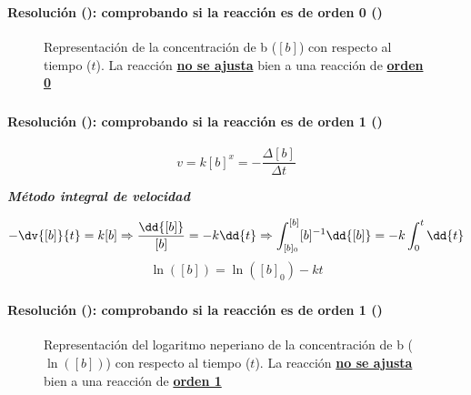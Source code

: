 \begin{frame}
    \frametitle{\ejerciciocmd}
    \framesubtitle{Resolución (): comprobando si la reacción es de orden 0 ()}
    \begin{center}
        \begin{figure}
            \caption{Representación de la concentración de b ($[b]$) con respecto al tiempo ($t$). La reacción \textbf{\underline{no se ajusta}} bien a una reacción de \textbf{\underline{orden 0}}}
            
        \end{figure}
    \end{center}
\end{frame}

\begin{frame}
    \frametitle{\ejerciciocmd}
    \framesubtitle{Resolución (): comprobando si la reacción es de orden 1 ()}
     
    $$
        v = k[b]^x = -\frac{\Delta[b]}{\Delta t}
    $$
    \begin{center}
        {\Large \textbf{\textit{Método integral de velocidad}}}
    \end{center}
    \begin{overprint}
            $$
                -\dv{[b]}{t} = k[b]\Rightarrow\frac{\dd{[b]}}{[b]} = -k\dd{t}\Rightarrow\int_{[b]_0}^{[b]}[b]^{-1}\dd{[b]} = -k\int_{0}^{t}\dd{t}
            $$
        $$
            \ln([b]) = \ln([b]_0) - kt
        $$
    \end{overprint}
\end{frame}

\begin{frame}
    \frametitle{\ejerciciocmd}
    \framesubtitle{Resolución (): comprobando si la reacción es de orden 1 ()}
    \begin{center}
        \begin{figure}
            \caption{Representación del logaritmo neperiano de la concentración de b ($\ln([b])$) con respecto al tiempo ($t$). La reacción \textbf{\underline{no se ajusta}} bien a una reacción de \textbf{\underline{orden 1}}}
            
        \end{figure}
    \end{center}
\end{frame}

